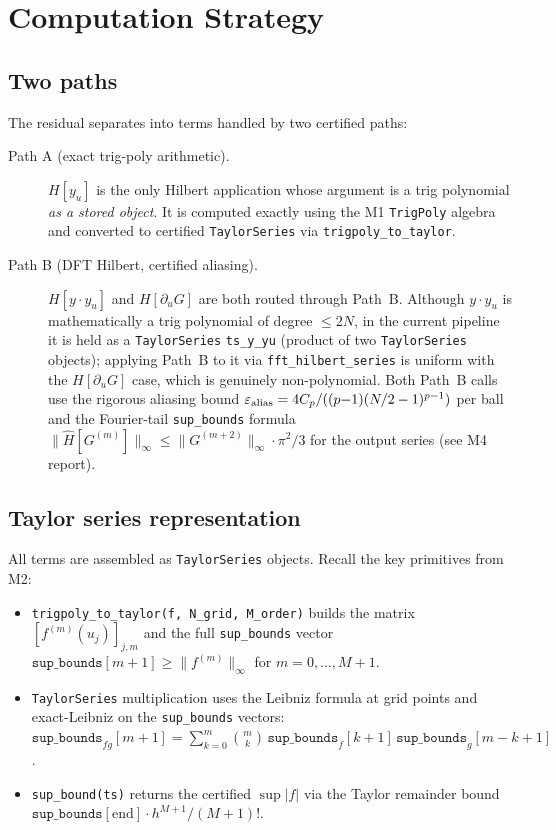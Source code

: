 \documentclass[11pt]{article}
\theoremstyle{definition}
\begin{document}
\section{Computation Strategy}

\subsection{Two paths}

The residual separates into terms handled by two certified paths:

\begin{description}
\item[Path A (exact trig-poly arithmetic).]
$H[y_u]$ is the only Hilbert application whose argument is a trig polynomial
\emph{as a stored object}.  It is computed exactly using the M1 \texttt{TrigPoly}
algebra and converted to certified \texttt{TaylorSeries} via
\texttt{trigpoly\_to\_taylor}.

\item[Path B (DFT Hilbert, certified aliasing).]
$H[y\cdot y_u]$ and $H[\partial_u G]$ are both routed through Path~B.
Although $y\cdot y_u$ is mathematically a trig polynomial of degree $\le 2N$,
in the current pipeline it is held as a \texttt{TaylorSeries}
\texttt{ts\_y\_yu} (product of two \texttt{TaylorSeries} objects); applying
Path~B to it via \texttt{fft\_hilbert\_series} is uniform with the
$H[\partial_u G]$ case, which is genuinely non-polynomial.
Both Path~B calls use the rigorous aliasing bound
$\varepsilon_{\rm alias} = 4C_p/((p{-}1)(N/2-1)^{p-1})$ per ball and the
Fourier-tail \texttt{sup\_bounds} formula $\|\hat H[G^{(m)}]\|_\infty \le
\|G^{(m+2)}\|_\infty \cdot \pi^2/3$ for the output series (see M4 report).
\end{description}

\subsection{Taylor series representation}

All terms are assembled as \texttt{TaylorSeries} objects.  Recall the
key primitives from M2:
\begin{itemize}
  \item \texttt{trigpoly\_to\_taylor(f, N\_grid, M\_order)} builds the matrix
        $[f^{(m)}(u_j)]_{j,m}$ and the full \texttt{sup\_bounds} vector
        $\texttt{sup\_bounds}[m+1] \ge \|f^{(m)}\|_\infty$ for $m = 0,\ldots,M{+}1$.
  \item \texttt{TaylorSeries} multiplication uses the Leibniz formula at
        grid points and exact-Leibniz on the \texttt{sup\_bounds} vectors:
        $\texttt{sup\_bounds}_{f g}[m{+}1] = \sum_{k=0}^{m} \binom{m}{k}
        \,\texttt{sup\_bounds}_f[k{+}1]\,\texttt{sup\_bounds}_g[m{-}k{+}1]$.
  \item \texttt{sup\_bound(ts)} returns the certified $\sup|f|$ via the
        Taylor remainder bound $\texttt{sup\_bounds}[\mathrm{end}]\cdot h^{M+1}/(M+1)!$.
\end{itemize}
\end{document}
